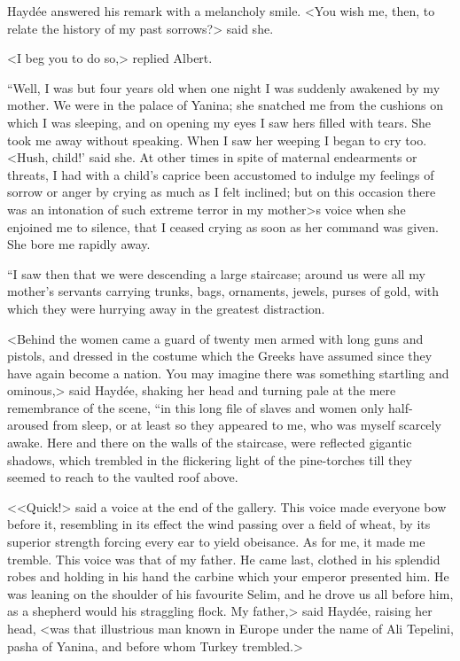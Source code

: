  Haydée answered his remark with a melancholy smile. <You wish me, then, to relate the history of my past sorrows?> said she. 

 <I beg you to do so,> replied Albert. 

 “Well, I was but four years old when one night I was suddenly awakened by my mother. We were in the palace of Yanina; she snatched me from the cushions on which I was sleeping, and on opening my eyes I saw hers filled with tears. She took me away without speaking. When I saw her weeping I began to cry too. <Hush, child!' said she. At other times in spite of maternal endearments or threats, I had with a child's caprice been accustomed to indulge my feelings of sorrow or anger by crying as much as I felt inclined; but on this occasion there was an intonation of such extreme terror in my mother>s voice when she enjoined me to silence, that I ceased crying as soon as her command was given. She bore me rapidly away. 

 “I saw then that we were descending a large staircase; around us were all my mother's servants carrying trunks, bags, ornaments, jewels, purses of gold, with which they were hurrying away in the greatest distraction. 

 <Behind the women came a guard of twenty men armed with long guns and pistols, and dressed in the costume which the Greeks have assumed since they have again become a nation. You may imagine there was something startling and ominous,> said Haydée, shaking her head and turning pale at the mere remembrance of the scene, “in this long file of slaves and women only half-aroused from sleep, or at least so they appeared to me, who was myself scarcely awake. Here and there on the walls of the staircase, were reflected gigantic shadows, which trembled in the flickering light of the pine-torches till they seemed to reach to the vaulted roof above. 

 <<Quick!> said a voice at the end of the gallery. This voice made everyone bow before it, resembling in its effect the wind passing over a field of wheat, by its superior strength forcing every ear to yield obeisance. As for me, it made me tremble. This voice was that of my father. He came last, clothed in his splendid robes and holding in his hand the carbine which your emperor presented him. He was leaning on the shoulder of his favourite Selim, and he drove us all before him, as a shepherd would his straggling flock. My father,> said Haydée, raising her head, <was that illustrious man known in Europe under the name of Ali Tepelini, pasha of Yanina, and before whom Turkey trembled.> 

